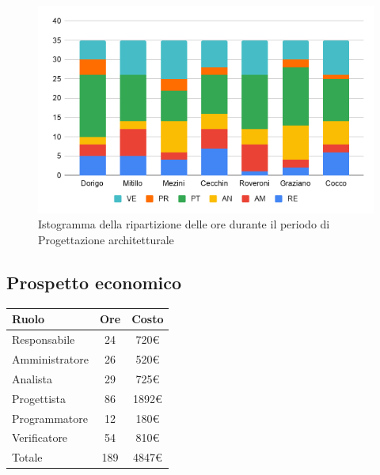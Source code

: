 {{{{{\begin{figure}[!ht]
	\begin{center}
		\includegraphics[width=0.8\linewidth]{../immagini/pdp/istogramma_progettazione_architetturale.png}
		\caption{Istogramma della ripartizione delle ore durante il periodo di Progettazione
			architetturale}
	\end{center}
\end{figure}

\subsection{Prospetto economico}\label{PreventivoFaseDiProgettazioneArchitetturaleProspettoEconomico}
\quad
\def\tabularxcolumn#1{m{#1}}
{
	\begin{center}
		\renewcommand{\arraystretch}{1.4}
		\begin{tabularx}{7cm}{|X|c|c|}
			\hline
			\rowcolor{airforceblue}
			\textbf{Ruolo} & \textbf{Ore} & \textbf{Costo}\\
			\hline
			Responsabile & 24 & 720\euro\\
			\hline
			Amministratore & 26 & 520\euro\\
			\hline
			Analista & 29 & 725\euro\\
			\hline
			Progettista & 86 & 1892\euro\\
			\hline
			Programmatore & 12 & 180\euro\\
			\hline
			Verificatore & 54 & 810\euro\\
			\hline
			Totale & 189 & 4847\euro\\
			\hline
		\end{tabularx}
	\end{center}

}}}}}}
